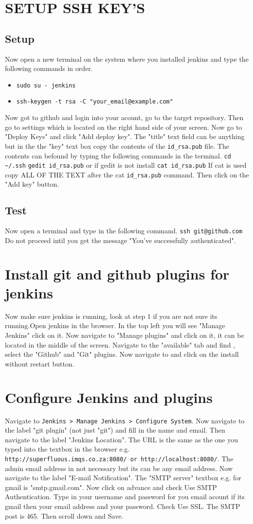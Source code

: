 \documentclass[a4paper]{article}
\begin{document}
\section{SETUP SSH KEY'S}
\subsection{Setup}
Now open a new terminal on the system where you installed jenkins and type the following commands in order.
\begin{itemize}
\item \verb#sudo su - jenkins#
\item \verb#ssh-keygen -t rsa -C "your_email@example.com"#
\end{itemize}
Now got to github and login into your acount, go to the target repository. Then go to settings which is located on the right hand side of your screen. Now go to "Deploy Keys" and click "Add deploy key". The "title" text field can be anything but in the the "key" text box copy the contents of the \verb#id_rsa.pub#
file. The contents can befound by typing the following commands in the terminal.
\verb#cd ~/.ssh#
\verb#gedit id_rsa.pub#
or if gedit is not install
\verb#cat id_rsa.pub#
If cat is used copy ALL OF THE TEXT after the cat \verb#id_rsa.pub# command.
Then click on the "Add key" button.
\subsection{Test}
Now open a terminal and type in the following command.
\verb#ssh git@github.com#
 Do not proceed intil you get the message "You've successfully authenticated".
\section{Install git and github plugins for jenkins}
Now make sure jenkins is running, look at step 1 if you are not sure its running.Open jenkins in the browser.
In the top left you will see "Manage Jenkins" click on it.
Now navigate to "Manage plugins" and click on it, it can be located in the middle of the screen.
Navigate to the "available" tab and find , select the "Github" and "Git" plugins. Now navigate to and click on the install without restart button.
\section{Configure Jenkins and plugins}
Navigate to \verb#Jenkins > Manage Jenkins > Configure System#.
Now navigate to the label "git plugin" (not just "git") 
and fill in the name and email.
Then navigate to the label "Jenkins Location".
The URL is the same as the one you typed into the textbox in the browser e.g.
\verb#http://superfluous.imqs.co.za:8080/ or http://localhost:8080/#. The admin email address in not necessary but its can be any email address.
Now navigate to the label "E-mail Notification". The "SMTP server" textbox e.g. for gmail is "smtp.gmail.com".
Now click on advance and check Use SMTP Authentication.
Type in your username and password for you email acount if its gmail then your email address and your password.
Check Use SSL. The SMTP post is 465.
Then scroll down and Save.
\end{document}
